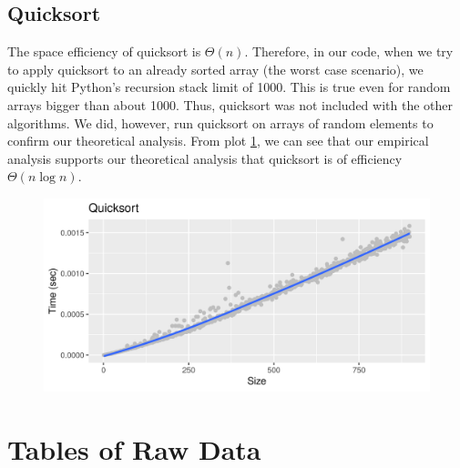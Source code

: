\documentclass[letterpaper, 11pt]{article}
\begin{document}
\subsection{Quicksort} \label{quicksort}
The space efficiency of quicksort is \(\Theta(n)\). Therefore, in our code,
when we try to apply quicksort to an already sorted array (the worst case
scenario), we quickly hit Python's recursion stack limit of 1000. This is true
even for random arrays bigger than about 1000. Thus, quicksort was not included
with the other algorithms. We did, however, run quicksort on arrays of random
elements to confirm our theoretical analysis.  From plot \ref{fig:quick}, we
can see that our empirical analysis supports our theoretical analysis that
quicksort is of efficiency \(\Theta(n \log n)\). 

\begin{figure}[h]
  \includegraphics[width=\linewidth]{quick.png}
  \label{fig:quick}
\end{figure}


\newpage
\appendix
\section{Tables of Raw Data} \label{tables}
\end{document}
